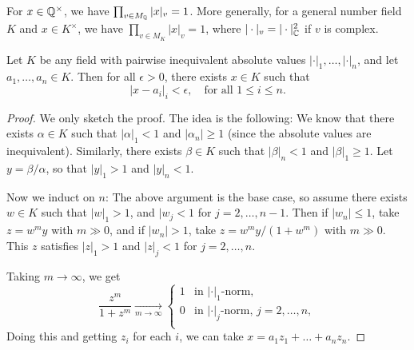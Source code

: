 \begin{theorem}
  For $x \in \mathbb{Q}^\times$, we have
  $\prod_{v \in M_{\mathbb{Q}}} |x|_v = 1$. More generally,
  for a general number field $K$ and $x \in K^\times$,
  we have $\prod_{v \in M_K} |x|_v = 1$, where
  $|\cdot|_v = |\cdot|_{\mathbb{C}}^2$ if $v$ is complex.
\end{theorem}

\begin{theorem}
  Let $K$ be any field with pairwise inequivalent
  absolute values $|\cdot|_1, \dots, |\cdot|_n$, and
  let $a_1, \dots, a_n \in K$. Then for all
  $\epsilon > 0$, there exists $x \in K$ such that
  \[
    |x - a_i|_{i} < \epsilon, \quad \text{for all $1 \le i \le n$}.
  \]
\end{theorem}

\begin{proof}
  We only sketch the proof. The idea is the following:
  We know that there exists $\alpha \in K$ such that
  $|\alpha|_1 < 1$ and $|\alpha_n| \ge 1$ (since
  the absolute values are inequivalent). Similarly,
  there exists $\beta \in K$ such that
  $|\beta|_n < 1$ and $|\beta|_1 \ge 1$. Let
  $y = \beta / \alpha$, so that
  $|y|_1 > 1$ and $|y|_n < 1$.

  Now we induct on $n$: The above argument is the base
  case, so assume there exists $w \in K$ such that
  $|w|_1 > 1$, and $|w_j < 1$ for $j = 2, \dots, n - 1$.
  Then if $|w_n| \le 1$, take $z = w^m y$ with
  $m \gg 0$, and if $|w_n| > 1$, take $z = w^m y / (1 + w^m)$
  with $m \gg 0$. This $z$ satisfies
  $|z|_1 > 1$ and $|z|_j < 1$ for $j = 2, \dots, n$.

  Taking $m \to \infty$, we get
  \[
    \frac{z^m}{1 + z^m} \xrightarrow[m \to \infty]{}
    \begin{cases}
      1 & \text{in $|\cdot|_1$-norm}, \\
      0 & \text{in $|\cdot|_j$-norm, $j = 2, \dots, n$}, \\
    \end{cases}
  \]
  Doing this and getting $z_i$ for each $i$, we can take
  $x = a_1 z_1 + \dots + a_n z_n$.
\end{proof}
